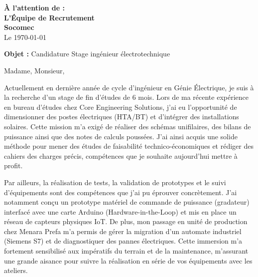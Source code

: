 \documentclass[10pt,a4paper]{altacv}
\makeatletter
\renewcommand{\makecvheader}{%
  \begingroup
    \raggedright\color{emphasis}%
    {\Huge\bfseries\MakeUppercase{\@name}\par}
    \medskip
    {\large\bfseries\color{accent}\@tagline\par}
    \medskip
    {\footnotesize\bfseries\@personalinfo\par}
  \endgroup\medskip
}
\makeatother
\begin{document}

\makecvheader

\bigskip

\begin{flushright}
  {\color{emphasis}\textbf{À l'attention de :}} \\[2pt]
  \textbf{L'Équipe de Recrutement} \\
  \textbf{Socomec} \\[20pt]
  Le \today
\end{flushright}
\bigskip

\bigskip

{\color{accent}\textbf{Objet :}} Candidature Stage ingénieur électrotechnique

\bigskip\bigskip

Madame, Monsieur,

\vspace{0.4cm}

Actuellement en dernière année de cycle d'ingénieur en Génie Électrique, je suis à la recherche d'un stage de fin d'études de 6 mois. Lors de ma récente expérience en bureau d'études chez Core Engineering Solutions, j'ai eu l'opportunité de dimensionner des postes électriques (HTA/BT) et d'intégrer des installations solaires. Cette mission m'a exigé de réaliser des schémas unifilaires, des bilans de puissance ainsi que des notes de calculs poussées. J'ai ainsi acquis une solide méthode pour mener des études de faisabilité technico-économiques et rédiger des cahiers des charges précis, compétences que je souhaite aujourd'hui mettre à profit.

\vspace{0.4cm}

Par ailleurs, la réalisation de tests, la validation de prototypes et le suivi d'équipements sont des compétences que j'ai pu éprouver concrètement. J'ai notamment conçu un prototype matériel de commande de puissance (gradateur) interfacé avec une carte Arduino (Hardware-in-the-Loop) et mis en place un réseau de capteurs physiques IoT. De plus, mon passage en unité de production chez Menara Prefa m'a permis de gérer la migration d'un automate industriel (Siemens S7) et de diagnostiquer des pannes électriques. Cette immersion m'a fortement sensibilisé aux impératifs du terrain et de la maintenance, m'assurant une grande aisance pour suivre la réalisation en série de vos équipements avec les ateliers.
\end{document}
